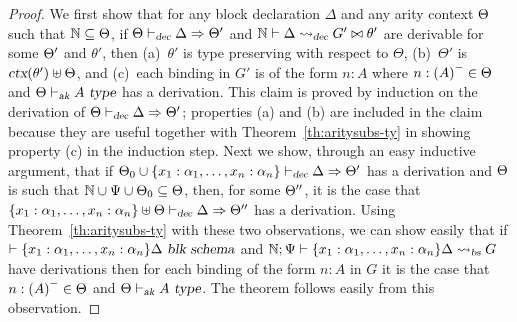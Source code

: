 \begin{proof}
We first show that for any block declaration
$\Delta$ and any arity context $\Theta$ such that $\mathbb{N}
\subseteq \Theta$, if $\Theta \vdash_{\mbox{\sl \scriptsize dec}} \Delta \Rightarrow \Theta'$ and
$\mathbb{N} \vdash \Delta \leadsto_{\mbox{\sl \scriptsize dec}} G' \bowtie \theta'$ are derivable for some $\Theta'$
and $\theta'$, then (a)~$\theta'$ is type preserving with respect to
$\Theta$, (b)~$\Theta'$ is $\mbox{\sl ctx}(\theta') \uplus \Theta$, and
(c)~each binding in $G'$ is of the form $n : A$ where $n:{(A)}^{-}\in
\Theta$ and $\Theta \vdash_{\mbox{\sl \scriptsize ak}} A\ \mbox{\sl type}$ has a derivation.
%
This claim is proved by induction on the derivation of
$\Theta \vdash_{\mbox{\sl \scriptsize dec}} \Delta \Rightarrow \Theta'$; properties (a) and (b)
are included in the claim because they are useful together with
Theorem~\ref{th:aritysubs-ty} in showing property (c) in the
induction step. 
%
Next we show, through an easy inductive argument, that if
$\Theta_0 \cup \{x_1 : \alpha_1, \ldots,
                              x_n : \alpha_n\} \vdash_{\mbox{\sl \scriptsize dec}} \Delta \Rightarrow \Theta'$
has a derivation and $\Theta$ is such that
$\mathbb{N} \cup \Psi \cup \Theta_0 \subseteq \Theta$, then, for
some $\Theta''$, it is the case that 
$\{x_1 : \alpha_1, \ldots,x_n : \alpha_n\} \uplus \Theta \vdash_{\mbox{\sl \scriptsize dec}} \Delta \Rightarrow \Theta''$
has a derivation.
%
Using Theorem~\ref{th:aritysubs-ty} with these two
observations, we can show easily that if
$\vdash \{x_1 : \alpha_1,\ldots, x_n : \alpha_n\}\Delta\ \mbox{\sl blk schema}$ and 
$\mathbb{N} ; \Psi \vdash \{x_1 : \alpha_1,\ldots, x_n : \alpha_n\}\Delta \leadsto_{\mbox{\sl \scriptsize bs}} G$ 
have derivations then for each binding of the form $n:A$ in $G$ it is
the case that $n:{(A)}^{-} \in \Theta$ and $\Theta \vdash_{\mbox{\sl \scriptsize ak}} A\ \mbox{\sl type}$.
%
The theorem follows easily from this observation.
\end{proof}

